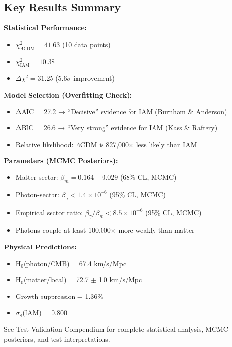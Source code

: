 \documentclass[11pt]{article}
\begin{document}
\subsection{Key Results Summary}

\textbf{Statistical Performance:}
\begin{itemize}
    \item $\chi^2_{\Lambda\text{CDM}} = 41.63$ (10 data points)
    \item $\chi^2_{\text{IAM}} = 10.38$
    \item $\Delta\chi^2 = 31.25$ (5.6$\sigma$ improvement)
\end{itemize}

\textbf{Model Selection (Overfitting Check):}
\begin{itemize}
    \item ΔAIC = 27.2 → ``Decisive'' evidence for IAM (Burnham \& Anderson)
    \item ΔBIC = 26.6 → ``Very strong'' evidence for IAM (Kass \& Raftery)
    \item Relative likelihood: $\Lambda$CDM is 827,000$\times$ less likely than IAM
\end{itemize}

\textbf{Parameters (MCMC Posteriors):}
\begin{itemize}
    \item Matter-sector: $\beta_m = 0.164 \pm 0.029$ (68\% CL, MCMC)
    \item Photon-sector: $\beta_\gamma < 1.4 \times 10^{-6}$ (95\% CL, MCMC)
    \item Empirical sector ratio: $\beta_\gamma/\beta_m < 8.5 \times 10^{-6}$ (95\% CL, MCMC)
    \item Photons couple at least 100,000$\times$ more weakly than matter
\end{itemize}

\textbf{Physical Predictions:}
\begin{itemize}
    \item H$_0$(photon/CMB) = 67.4 km/s/Mpc
    \item H$_0$(matter/local) = 72.7 $\pm$ 1.0 km/s/Mpc
    \item Growth suppression = 1.36\%
    \item $\sigma_8$(IAM) = 0.800
\end{itemize}

\noindent See Test Validation Compendium for complete statistical analysis, MCMC posteriors, and test interpretations.

\end{document}
